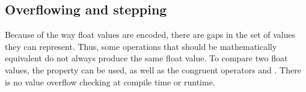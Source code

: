 \subsection{Overflowing and stepping}

Because of the way float values are encoded, there are gaps in the set of values
they can represent. Thus, some operations that should be mathematically
equivalent do not always produce the same float value. To compare two float
values, the property  can be used, as well as the congruent
operators \token{<=>} and \token{<!>}. There is no value overflow checking
at compile time or runtime.

\vfill%
\pagebreak
